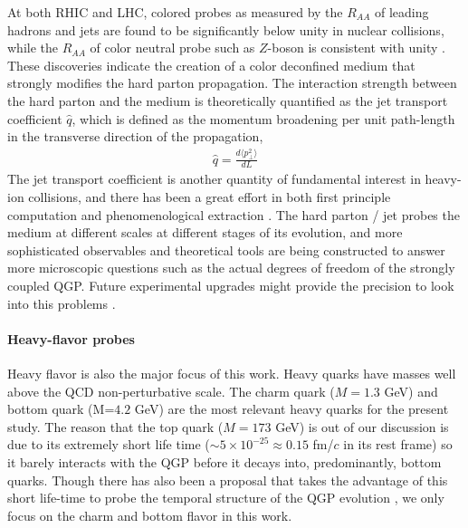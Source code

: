 At both RHIC and LHC, colored probes as measured by the $R_{AA}$ of leading hadrons and jets are found to be significantly below unity in nuclear collisions, while the $R_{AA}$ of color neutral probe such as $Z$-boson is consistent with unity \cite{Adare:2008qa,Chatrchyan:2011ua,Afanasiev:2012dg,Aad:2012ew,Aad:2015lcb,Adam:2015lda,ATLAS:2017zkv}.
These discoveries indicate the creation of a color deconfined medium that strongly modifies the hard parton propagation.
The interaction strength between the hard parton and the medium is theoretically quantified as the jet transport coefficient $\hat{q}$, which is defined as the momentum broadening per unit path-length in the transverse direction of the propagation,
\begin{eqnarray}
\hat{q} = \frac{d\langle p_\perp^2 \rangle}{dL}
\end{eqnarray}
The jet transport coefficient is another quantity of fundamental interest  in heavy-ion collisions, and there has been a great effort in both first principle computation and phenomenological extraction \cite{Wang:1994fx,Zakharov:1996fv,Baier:1996sk,Zakharov:1997uu,Arnold:2002zm,Gyulassy:2003mc,Kovner:2003zj,Jeon:2003gi,CasalderreySolana:2007pr,Djordjevic:2008iz,Bass:2008rv,Schenke:2009gb,Majumder:2009zu,Majumder:2010qh,Armesto:2011ht,Zapp:2011ya,Ovanesyan:2011xy,Kang:2014xsa,Cao:2016gvr,Kauder:2018cdt,Cao:2017zih}.
The hard parton / jet probes the medium at different scales at different stages of its evolution, and more sophisticated observables and theoretical tools are being constructed to answer more microscopic questions such as the actual degrees of freedom of the strongly coupled QGP.
Future experimental upgrades might provide the precision to look into this problems \cite{ATLAS-Collaboration:2012iwa,Abelevetal:2014dna,STAR:upgrade-hf,Adare:2015kwa,CMS:2017dec}.

\paragraph{Heavy-flavor probes}
Heavy flavor is also the major focus of this work.
Heavy quarks have masses well above the QCD non-perturbative scale.
The charm quark ($M=1.3$ GeV) and bottom quark (M=$4.2$ GeV) are the most relevant heavy quarks for the present study.
The reason that the top quark ($M = 173$ GeV) is out of our discussion is due to its extremely short life time ($\sim 5\times 10^{-25} \approx 0.15$  fm/$c$ in its rest frame) so it barely interacts with the QGP before it decays into, predominantly, bottom quarks.
Though there has also been a proposal that takes the advantage of this short life-time to probe the temporal structure of the QGP evolution \cite{Apolinario:2017sob}, we only focus on the charm and bottom flavor in this work.

